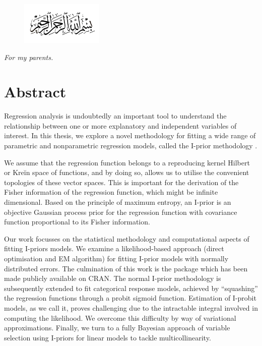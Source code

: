 \documentclass[11pt,twoside,openright]{report}
\begin{document}
\setcounter{page}{3}

\vspace*{5mm}
\begin{figure}[H]
  \centering
  \includegraphics[width=0.35\textwidth]{figure/bismillah}
\end{figure}
\vspace*{0.75cm}
\begin{center}
  \textit{For my parents.}
\end{center}

\chapter*{Abstract}

Regression analysis is undoubtedly an important tool to understand the relationship between one or more explanatory and independent variables of interest. 
In this thesis, we explore a novel methodology for fitting a wide range of parametric and nonparametric regression models, called the I-prior methodology \citep{bergsma2017}.

We assume that the regression function belongs to a reproducing kernel Hilbert or Kreĭn space of functions, and by doing so, allows us to utilise the convenient topologies of these vector spaces. 
This is important for the derivation of the Fisher information of the regression function, which might be infinite dimensional.
Based on the principle of maximum entropy, an I-prior is an objective Gaussian process prior for the regression function with covariance function proportional to its Fisher information. 

Our work focusses on the statistical methodology and computational aspects of fitting I-priors models. 
We examine a likelihood-based approach (direct optimisation and EM algorithm) for fitting I-prior models with normally distributed errors.
The culmination of this work is the  package  \citep{jamil2017iprior} which has been made publicly available on CRAN. 
The normal I-prior methodology is subsequently extended to fit categorical response models, achieved by ``squashing'' the regression functions through a probit sigmoid function.
Estimation of I-probit models, as we call it, proves challenging due to the intractable integral involved in computing the likelihood. 
We overcome this difficulty by way of variational approximations.
Finally, we turn to a fully Bayesian approach of variable selection using I-priors for linear models to tackle multicollinearity.
\end{document}
